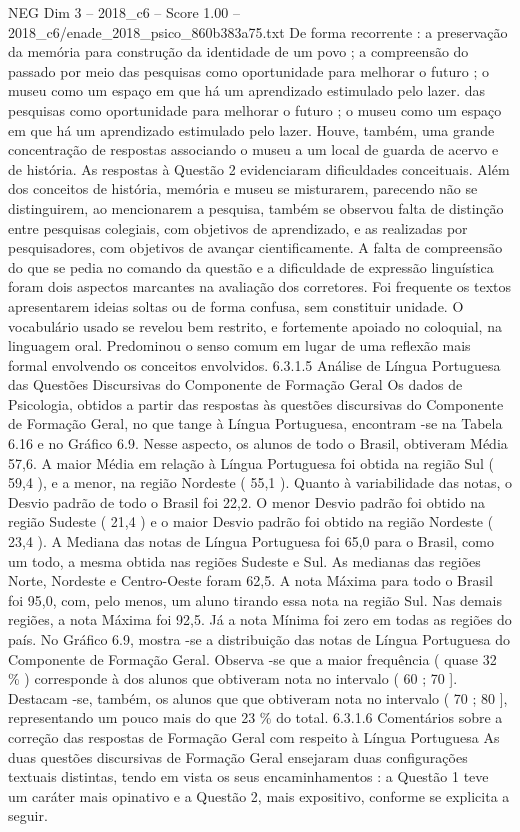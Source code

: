 \begin{textsample}{NEG Dim 3 – 2018\_c6 – Score 1.00 – 2018\_c6/enade\_2018\_psico\_860b383a75.txt}
De forma recorrente : a preservação da memória para construção da identidade de um povo ; a compreensão do passado por meio das pesquisas como oportunidade para melhorar o futuro ; o museu como um espaço em que há um aprendizado estimulado pelo lazer. das pesquisas como oportunidade para melhorar o futuro ; o museu como um espaço em que há um aprendizado estimulado pelo lazer.
Houve, também, uma grande concentração de respostas associando o museu a um local de guarda de acervo e de história.
As respostas à Questão 2 evidenciaram dificuldades conceituais.
Além dos conceitos de história, memória e museu se misturarem, parecendo não se distinguirem, ao mencionarem a pesquisa, também se observou falta de distinção entre pesquisas colegiais, com objetivos de aprendizado, e as realizadas por pesquisadores, com objetivos de avançar cientificamente.
A falta de compreensão do que se pedia no comando da questão e a dificuldade de expressão linguística foram dois aspectos marcantes na avaliação dos corretores.
Foi frequente os textos apresentarem ideias soltas ou de forma confusa, sem constituir unidade.
O vocabulário usado se revelou bem restrito, e fortemente apoiado no coloquial, na linguagem oral.
Predominou o senso comum em lugar de uma reflexão mais formal envolvendo os conceitos envolvidos. 6.3.1.5 Análise de Língua Portuguesa das Questões Discursivas do Componente de Formação Geral Os dados de Psicologia, obtidos a partir das respostas às questões discursivas do Componente de Formação Geral, no que tange à Língua Portuguesa, encontram -se na Tabela 6.16 e no Gráfico 6.9.
Nesse aspecto, os alunos de todo o Brasil, obtiveram Média 57,6.
A maior Média em relação à Língua Portuguesa foi obtida na região Sul ( 59,4 ), e a menor, na região Nordeste ( 55,1 ).
Quanto à variabilidade das notas, o Desvio padrão de todo o Brasil foi 22,2.
O menor Desvio padrão foi obtido na região Sudeste ( 21,4 ) e o maior Desvio padrão foi obtido na região Nordeste ( 23,4 ).
A Mediana das notas de Língua Portuguesa foi 65,0 para o Brasil, como um todo, a mesma obtida nas regiões Sudeste e Sul.
As medianas das regiões Norte, Nordeste e Centro-Oeste foram 62,5.
A nota Máxima para todo o Brasil foi 95,0, com, pelo menos, um aluno tirando essa nota na região Sul.
Nas demais regiões, a nota Máxima foi 92,5.
Já a nota Mínima foi zero em todas as regiões do país.
No Gráfico 6.9, mostra -se a distribuição das notas de Língua Portuguesa do Componente de Formação Geral.
Observa -se que a maior frequência ( quase 32 \% ) corresponde à dos alunos que obtiveram nota no intervalo ( 60 ; 70 ].
Destacam -se, também, os alunos que que obtiveram nota no intervalo ( 70 ; 80 ], representando um pouco mais do que 23 \% do total. 6.3.1.6 Comentários sobre a correção das respostas de Formação Geral com respeito à Língua Portuguesa As duas questões discursivas de Formação Geral ensejaram duas configurações textuais distintas, tendo em vista os seus encaminhamentos : a Questão 1 teve um caráter mais opinativo e a Questão 2, mais expositivo, conforme se explicita a seguir.

\end{textsample}
